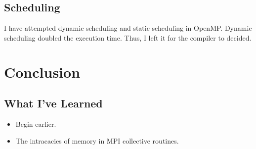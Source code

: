 \documentclass[a4paper, 10pt]{article}
\begin{document}
    \subsection{Scheduling}
      I have attempted dynamic scheduling and static scheduling in OpenMP.
      Dynamic scheduling doubled the execution time.
      Thus, I left it for the compiler to decided.

  \section{Conclusion}
  \subsection{What I've Learned}
    \begin{itemize}
      \item Begin earlier.
      \item The intracacies of memory in MPI collective routines.
    \end{itemize}
\end{document}
